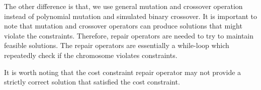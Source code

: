 \documentclass{llncs}
\begin{document}
The other difference is that, we use general mutation and crossover operation instead of polynomial mutation and simulated binary crossover.
It is important to note that mutation and crossover operators can produce solutions that might violate the constraints. 
Therefore, repair operators are needed to try to maintain feasible solutions. The repair operators are essentially a while-loop 
which repeatedly check if the chromosome violates constraints.

It is worth noting that the cost constraint repair operator may not provide a strictly correct solution that satisfied the cost constraint.

%
%
\end{document}

